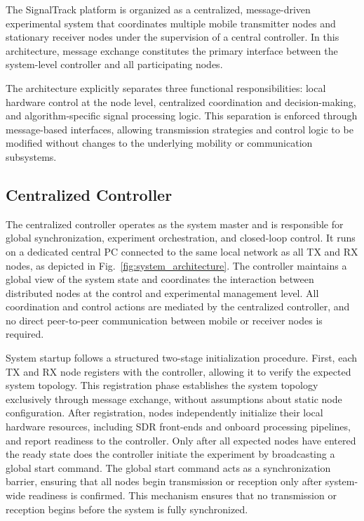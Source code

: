 \documentclass[conference,a4paper]{IEEEtran}
\begin{document}
\label{sec:system_architecture}

The SignalTrack platform is organized as a centralized, message-driven experimental system that coordinates multiple mobile transmitter nodes and stationary receiver nodes under the supervision of a central controller. In this architecture, message exchange constitutes the primary interface between the system-level controller and all participating nodes.

The architecture explicitly separates three functional responsibilities: local hardware control at the node level, centralized coordination and decision-making, and algorithm-specific signal processing logic. This separation is enforced through message-based interfaces, allowing transmission strategies and control logic to be modified without changes to the underlying mobility or communication subsystems.


\subsection{Centralized Controller}

The centralized controller operates as the system master and is responsible for global synchronization, experiment orchestration, and closed-loop control. It runs on a dedicated central PC connected to the same local network as all TX and RX nodes, as depicted in Fig.~\ref{fig:system_architecture}. The controller maintains a global view of the system state and coordinates the interaction between distributed nodes at the control and experimental management level. All coordination and control actions are mediated by the centralized controller, and no direct peer-to-peer communication between mobile or receiver nodes is required. 

System startup follows a structured two-stage initialization procedure. First, each TX and RX node registers with the controller, allowing it to verify the expected system topology. This registration phase establishes the system topology exclusively through message exchange, without assumptions about static node configuration. After registration, nodes independently initialize their local hardware resources, including SDR front-ends and onboard processing pipelines, and report readiness to the controller. Only after all expected nodes have entered the ready state does the controller initiate the experiment by broadcasting a global start command. The global start command acts as a synchronization barrier, ensuring that all nodes
begin transmission or reception only after system-wide readiness is confirmed. This mechanism ensures that no transmission or reception begins before the system is fully synchronized. 
\end{document}
